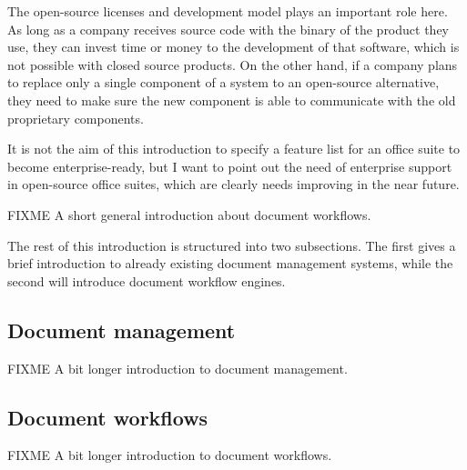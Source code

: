 The open-source licenses and development model plays an important role here. As
long as a company receives source code with the binary of the product they use,
they can invest time or money to the development of that software, which is not
possible with closed source products. On the other hand, if a company plans to
replace only a single component of a system to an open-source alternative, they
need to make sure the new component is able to communicate with the old
proprietary components.

It is not the aim of this introduction to specify a feature list for an office
suite to become enterprise-ready, but I want to point out the need of
enterprise support in open-source office suites, which are clearly needs
improving in the near future.

FIXME A short general introduction about document workflows.

The rest of this introduction is structured into two subsections. The first
gives a brief introduction to already existing document management systems,
while the second will introduce document workflow engines.

\subsection{Document management}

FIXME A bit longer introduction to document management.

\subsection{Document workflows}

FIXME A bit longer introduction to document workflows.
